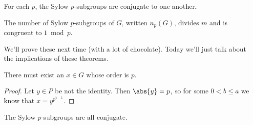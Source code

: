 \begin{theorem}[Sylow II]
For each $p$, the Sylow $p$-subgroups are conjugate to one another.
\end{theorem}

\begin{theorem}
The number of Sylow $p$-subgroups of $G$, written $n_p(G)$, divides $m$ and is congruent to $1 \bmod{p}$.
\end{theorem}

We'll prove these next time (with a lot of chocolate). Today we'll just talk about the implications of these theorems.

\begin{corollary}
There must exist an $x \in G$ whose order is $p$.
\end{corollary}
\begin{proof}
Let $y \in P$ be not the identity. Then $\abs{y} = p$, so for some $0 < b \leq a$ we know that $x = y^{p^{b-1}}$.
\end{proof}

\begin{corollary}
The Sylow $p$-subgroups are all conjugate.
\end{corollary}